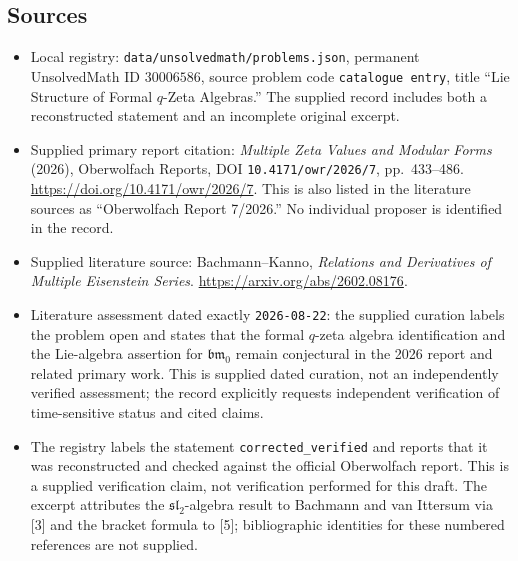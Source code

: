 \documentclass[11pt]{article}
\begin{document}
\subsection{Sources}
\begin{itemize}
\item Local registry: \texttt{data/unsolvedmath/problems.json}, permanent UnsolvedMath ID \(30006586\), source problem code \texttt{catalogue entry}, title ``Lie Structure of Formal \(q\)-Zeta Algebras.'' The supplied record includes both a reconstructed statement and an incomplete original excerpt.
\item Supplied primary report citation: \emph{Multiple Zeta Values and Modular Forms} (2026), Oberwolfach Reports, DOI \texttt{10.4171/owr/2026/7}, pp.\ 433--486. \url{https://doi.org/10.4171/owr/2026/7}. This is also listed in the literature sources as ``Oberwolfach Report 7/2026.'' No individual proposer is identified in the record.
\item Supplied literature source: Bachmann--Kanno, \emph{Relations and Derivatives of Multiple Eisenstein Series}. \url{https://arxiv.org/abs/2602.08176}.
\item Literature assessment dated exactly \texttt{2026-08-22}: the supplied curation labels the problem open and states that the formal \(q\)-zeta algebra identification and the Lie-algebra assertion for \(\mathfrak{bm}_0\) remain conjectural in the 2026 report and related primary work. This is supplied dated curation, not an independently verified assessment; the record explicitly requests independent verification of time-sensitive status and cited claims.
\item The registry labels the statement \texttt{corrected\_verified} and reports that it was reconstructed and checked against the official Oberwolfach report. This is a supplied verification claim, not verification performed for this draft. The excerpt attributes the \(\mathfrak{sl}_2\)-algebra result to Bachmann and van Ittersum via [3] and the bracket formula to [5]; bibliographic identities for these numbered references are not supplied.
\end{itemize}
\end{document}

